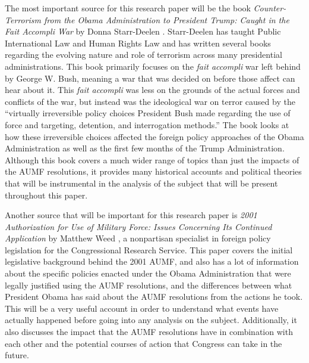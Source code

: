 \documentclass[12pt]{article}
\begin{document}
The most important source for this research paper will be the book \textit{Counter-Terrorism from the Obama Administration to President Trump: Caught in the Fait Accompli War} by Donna Starr-Deelen \autocite{starr-deelen2018}.
Starr-Deelen has taught Public International Law and Human Rights Law and has written several books regarding the evolving nature and role of terrorism across many presidential administrations.
This book primarily focuses on the \textit{fait accompli} war left behind by George W. Bush, meaning a war that was decided on before those affect can hear about it.
This \textit{fait accompli} was less on the grounds of the actual forces and conflicts of the war, but instead was the ideological war on terror caused by the ``virtually irreversible policy choices President Bush made regarding the use of force and targeting, detention, and interrogation methods.''\autocite[2]{starr-deelen2018}
The book looks at how these irreversible choices affected the foreign policy approaches of the Obama Administration as well as the first few months of the Trump Administration.
Although this book covers a much wider range of topics than just the impacts of the AUMF resolutions, it provides many historical accounts and political theories that will be instrumental in the analysis of the subject that will be present throughout this paper.

Another source that will be important for this research paper is \textit{2001 Authorization for Use of Military Force: Issues Concerning Its Continued Application} by Matthew Weed \autocite{weed2015}, a nonpartisan specialist in foreign policy legislation for the Congressional Research Service.
This paper covers the initial legislative background behind the 2001 AUMF, and also has a lot of information about the specific policies enacted under the Obama Administration that were legally justified using the AUMF resolutions, and the differences between what President Obama has said about the AUMF resolutions from the actions he took.
This will be a very useful account in order to understand what events have actually happened before going into any analysis on the subject.
Additionally, it also discusses the impact that the AUMF resolutions have in combination with each other and the potential courses of action that Congress can take in the future.
\end{document}

